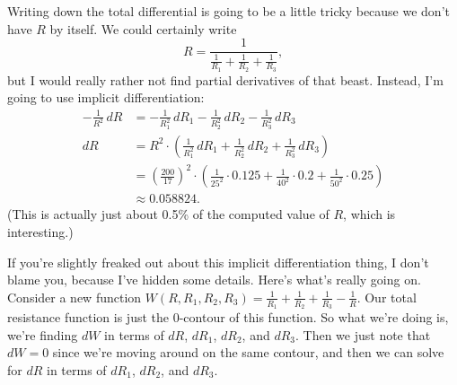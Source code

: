 \documentclass[10pt]{article}
\newenvironment{red}{\color{red}}{\ignorespacesafterend}
\begin{document}
\begin{enumerate}[leftmargin=0pt]
\begin{red}
        Writing down the total differential is going to be a little tricky because we don't have $R$ by itself. We could certainly write
        \[R = \frac{1}{\frac1{R_1} + \frac1{R_2} + \frac1{R_3}},\]
        but I would really rather not find partial derivatives of that beast. Instead, I'm going to use implicit differentiation:
        \begin{align*}
            -\frac{1}{R^2}\,dR &= -\frac{1}{R_1^2}\,dR_1 - \frac{1}{R_2^2}\,dR_2 - \frac{1}{R_3^2}\,dR_3 \\
            dR &= R^2\cdot \left( \frac{1}{R_1^2}\,dR_1 + \frac{1}{R_2^2}\,dR_2 + \frac{1}{R_3^2}\,dR_3 \right) \\
            &= \left(\frac{200}{17}\right)^2\cdot\left(
            \frac{1}{25^2}\cdot0.125 + \frac{1}{40^2}\cdot0.2+ \frac{1}{50^2}\cdot0.25
            \right) \\
            &\approx 0.058824.
        \end{align*}
        (This is actually just about 0.5\% of the computed value of $R$, which is interesting.)
        
        If you're slightly freaked out about this implicit differentiation thing, I don't blame you, because I've hidden some details. Here's what's really going on. Consider a new function $W(R, R_1, R_2, R_3) = \frac1{R_1} + \frac1{R_2} + \frac1{R_3} - \frac1R$. Our total resistance function is just the $0$-contour of this function. So what we're doing is, we're finding $dW$ in terms of $dR$, $dR_1$, $dR_2$, and $dR_3$. Then we just note that $dW = 0$ since we're moving around on the same contour, and then we can solve for $dR$ in terms of $dR_1$, $dR_2$, and $dR_3$.
        \end{red}
        
\end{enumerate}
\end{document}
